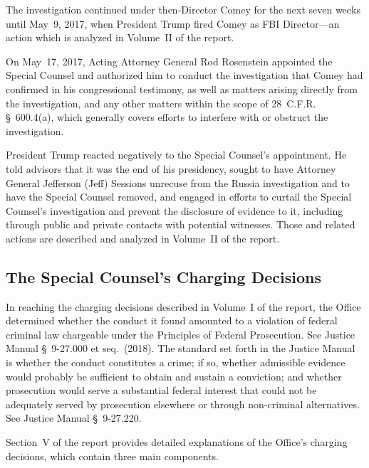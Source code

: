 The investigation continued under then-Director Comey for the next seven weeks until May~9, 2017, when President Trump fired Comey as FBI Director---an action which is analyzed in Volume~II of the report.

On May~17, 2017, Acting Attorney General Rod Rosenstein appointed the Special Counsel and authorized him to conduct the investigation that Comey had confirmed in his congressional testimony, as well as matters arising directly from the investigation, and any other matters within the scope of 28~C.F.R. \S~600.4(a), which generally covers efforts to interfere with or obstruct the investigation.

President Trump reacted negatively to the Special Counsel's appointment.
He told advisors that it was the end of his presidency, sought to have Attorney General Jefferson (Jeff) Sessions unrecuse from the Russia investigation and to have the Special Counsel removed, and engaged in efforts to curtail the Special Counsel's investigation and prevent the disclosure of evidence to it, including through public and private contacts with potential witnesses.
Those and related actions are described and analyzed in Volume~II of the report.

\hr

\subsection*{The Special Counsel's Charging Decisions}

In reaching the charging decisions described in Volume~I of the report, the Office determined whether the conduct it found amounted to a violation of federal criminal law chargeable under the Principles of Federal Prosecution.
See Justice Manual \S~9-27.000 et seq.~(2018).
The standard set forth in the Justice Manual is whether the conduct constitutes a crime; if so, whether admissible evidence would probably be sufficient to obtain and sustain a conviction; and whether prosecution would serve a substantial federal interest that could not be adequately served by prosecution elsewhere or through non-criminal alternatives.
See Justice Manual \S~9-27.220.

Section~V of the report provides detailed explanations of the Office's charging decisions, which contain three main components.

